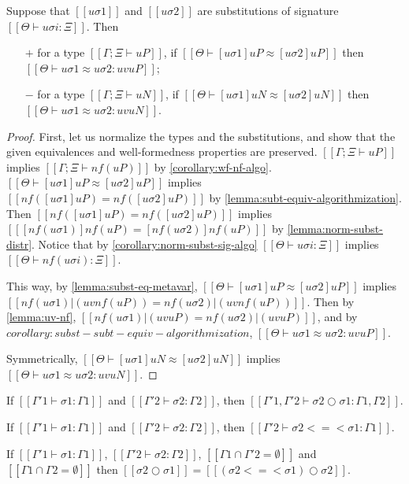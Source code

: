 \begin{corollary}
  \label{lemma:subst-equiv-metavar}
  Suppose that $[[uσ1]]$ and $[[uσ2]]$ are substitutions 
  of signature $[[Θ ⊢ uσi : Ξ]]$.
  Then 
  \begin{enumerate}
    \item [$+$] for a type $[[Γ; Ξ ⊢ uP]]$, if $[[Θ ⊢ [uσ1]uP ≈ [uσ2]uP]]$ then
      $[[Θ ⊢ uσ1 ≈ uσ2 : uv uP]]$;
    \item [$-$] for a type $[[Γ; Ξ ⊢ uN]]$, if $[[Θ ⊢ [uσ1]uN ≈ [uσ2]uN]]$ then
      $[[Θ ⊢ uσ1 ≈ uσ2 : uv uN]]$.
  \end{enumerate}
\end{corollary}
\begin{proof}
  First, let us normalize the types and the substitutions, and show that
  the given equivalences and well-formedness properties are preserved. 
  $[[Γ; Ξ ⊢ uP]]$ implies $[[Γ; Ξ ⊢ nf(uP)]]$ by \cref{corollary:wf-nf-algo}.
  $[[Θ ⊢ [uσ1]uP ≈ [uσ2]uP]]$ implies $[[ nf([uσ1]uP) = nf([uσ2]uP)]]$ by 
  \cref{lemma:subt-equiv-algorithmization}.
  Then $[[ nf([uσ1]uP) = nf([uσ2]uP)]]$ implies 
  $[[ [nf(uσ1)]nf(uP) = [nf(uσ2)]nf(uP)]]$ by \cref{lemma:norm-subst-distr}.
  Notice that by \cref{corollary:norm-subst-sig-algo}
  $[[Θ ⊢ uσi : Ξ]]$ implies $[[Θ ⊢ nf(uσi) : Ξ]]$.

  This way, by \cref{lemma:subst-eq-metavar}, 
  $[[Θ ⊢ [uσ1]uP ≈ [uσ2]uP]]$ implies 
  $[[nf(uσ1)|(uv nf(uP)) = nf(uσ2)|(uv nf(uP))]]$.
  Then by \cref{lemma:uv-nf}, 
  $[[nf(uσ1)|(uv uP) = nf(uσ2)|(uv uP)]]$,
  and by ${{corollary:subst-subt-equiv-algorithmization}}$,
  $[[Θ ⊢ uσ1 ≈ uσ2 : uv uP]]$.

  Symmetrically, 
  $[[Θ ⊢ [uσ1]uN ≈ [uσ2]uN]]$ implies 
  $[[Θ ⊢ uσ1 ≈ uσ2 : uv uN]]$.
\end{proof}

\begin{lemma}
  If $[[Γ'1 ⊢ σ1 : Γ1]]$ and $[[Γ'2 ⊢ σ2 : Γ2]]$,
  then $[[Γ'1, Γ'2 ⊢ σ2 ○ σ1 : Γ1, Γ2]]$.
\end{lemma}

\begin{lemma}
  \label{lemma:subst-monad-composition-wf}
  If $[[Γ'1 ⊢ σ1 : Γ1]]$ and $[[Γ'2 ⊢ σ2 : Γ2]]$,
  then $[[Γ'2 ⊢ σ2 <=< σ1 : Γ1]]$.
\end{lemma}

\begin{lemma}
  \label{lemma:subst-composition}
    If $[[Γ'1 ⊢ σ1 : Γ1]]$, $[[Γ'2 ⊢ σ2 : Γ2]]$, 
    $[[{Γ1} ∩ {Γ'2} = ∅ ]]$ and $[[ {Γ1} ∩ {Γ2} = ∅ ]]$ then 
    $[[ σ2 ○ σ1 ]] = [[ (σ2 <=< σ1) ○ σ2 ]]$.
\end{lemma}

